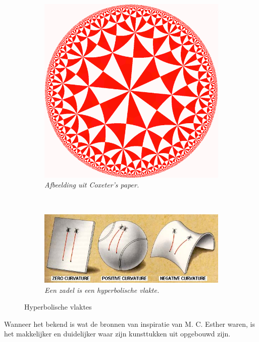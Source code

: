 \documentclass{article}
\begin{document}
\begin{figure}[Hh]
        \centering
        \begin{subfigure}{0.415\textwidth}
            \includegraphics[width=\textwidth]{hyperbolic_domains}
            \caption{\textit{Afbeelding uit Coxeter's paper.}}
			\label{fig:hyperbolic-domains}
        \end{subfigure}%
       	~ 
        \begin{subfigure}{0.5\textwidth}
			\includegraphics[width=\textwidth]{curved}
            \caption{\textit{Een zadel is een hyperbolische vlakte.}}
			\label{fig:curved}
        \end{subfigure}%
        \caption{Hyperbolische vlaktes}
        \label{fig:structCompare}
\end{figure}

Wanneer het bekend is wat de bronnen van inspiratie van M. C. Esther waren, is het makkelijker en duidelijker waar zijn kunsttukken uit opgebouwd zijn. 
\end{document}
